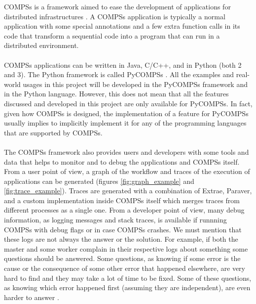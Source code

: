 \label{sec:compss}
COMPSs is a framework aimed to ease the development of applications for distributed infrastructures \cite{compss} \cite{Lordan2014}. A COMPSs application is typically a normal application with some special annotations and a few extra function calls in its code that transform a sequential code into a program that can run in a distributed environment.\\
\\
COMPSs applications can be written in Java, C/C++, and in Python (both 2 and 3). The Python framework is called PyCOMPSs \cite{pycompss}. All the examples and real-world usages in this project will be developed in the PyCOMPSs framework and in the Python language. However, this does not mean that all the features discussed and developed in this project are only available for PyCOMPSs. In fact, given how COMPSs is designed, the implementation of a feature for PyCOMPSs usually implies to implicitly implement it for any of the programming languages that are supported by COMPSs.\\
\\
The COMPSs framework also provides users and developers with some tools and data that helps to monitor and to debug the applications and COMPSs itself. From a user point of view, a graph of the workflow and traces of the execution of applications can be generated (figures \ref{fig:graph_example}  and \ref{fig:trace_example}). Traces are generated with a combination of Extrae, Paraver, and a custom implementation inside COMPSs itself which merges traces from different processes as a single one. From a developer point of view, many debug information, as logging messages and stack traces, is available if runnning COMPSs with debug flags or in case COMPSs crashes. We must mention that these logs are not always the answer or the solution. For example, if both the master and some worker complain in their respective logs about something some questions should be answered. Some questions, as knowing if some error is the cause or the consequence of some other error that happened elsewhere, are very hard to find and they may take a lot of time to be fixed.  Some of these questions, as knowing which error happened first (assuming they are independent), are even harder to answer \cite{Lamport}. 

